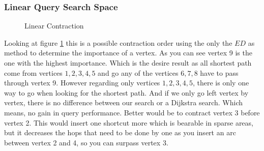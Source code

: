 \documentclass[11pt, rgb]{scrreprt}
\begin{document}
\subsubsection{Linear Query Search Space}\label{sec:linear_query}

\begin{figure}
\centering

\caption{Linear Contraction}
\label{fig:linear_contraction}
\end{figure}

Looking at figure \ref{fig:linear_contraction} this is a possible contraction order using the only the $ED$ as method to determine the importance of a vertex. As you can see vertex 9 is the one with the highest importance. Which is the desire result as all shortest path come from vertices ${1, 2, 3, 4, 5}$ and go any of the vertices ${6, 7, 8}$ have to pass through vertex 9. However regarding only vertices $1, 2, 3, 4, 5$, there is only one way to go when looking for the shortest path. And if we only go left vertex by vertex, there is no difference between our search or a Dijkstra search. Which means, no gain in query performance. Better would be to contract vertex 3 before vertex 2. This would insert one shortcut more which is bearable in sparse areas, but it decreases the hops that need to be done by one as you insert an arc between vertex 2 and 4, so you can surpass vertex 3. 
\end{document}
